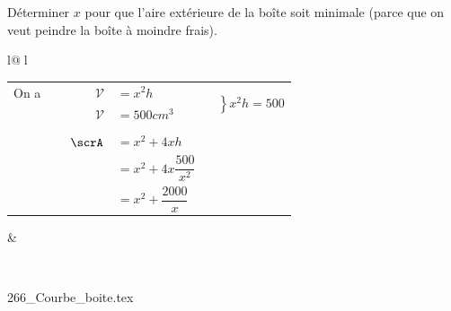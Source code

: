 Déterminer $x$ pour que l'aire extérieure de la boîte soit minimale (parce que on veut peindre la boîte à moindre frais). \\


\begin{tabular}{l@{$\;$}l}
{\renewcommand{\arraystretch }{1.75}
\begin{tabular}{r@{$\;$}ll}
On a $\qquad \qquad \mathcal{V}$ & $ = x^2h $ & \multirow{2}{3cm}{$\left.\begin{array}{c}
                                                 \\
                                                 \\
                                                 \end{array}\right \rbrace x^2h =500$ }\\
     $\mathcal{V}$ & $ = 500 cm^3  $ &\\
                   &            &     \\
     $\scrA$ & $ = x^2 + 4xh $ & \\  
                   & $ = x^2 + 4x \dfrac{500}{x^2} $ \\
                   & $ = x^2 + \dfrac{2000}{x}  $ \\           
\end{tabular}} & \raisebox{-10ex}{\parbox{8cm}{
                     \renewcommand{\arraystretch }{1.5}
                     \begin{tabular}{r@{$\;$}l}
                      Soit $f:$ & $ \mathbb{R}\rightarrow \mathbb{R} $ \\
                                & $ x \rightarrow f(x) : x^2 + \dfrac{2000}{x}    
                                      \qquad \qquad \mathrm{D}_f = ] 0,+\infty[ $ \\
                     \end{tabular}   \\              
                        Asymptote verticale $x=0$ \\
                        \begin{tabular}{r@{$\;$}l}
                            RG de $f$ en abscisse & : 1 cm pour 5 \\
                                       en ordonnées & : 1 cm pour 100.\\
                       \end{tabular}
                       }} \\
\end{tabular}\\
\renewcommand{\arraystretch }{1}
\centerline{ {266_Courbe_boite.tex}}

